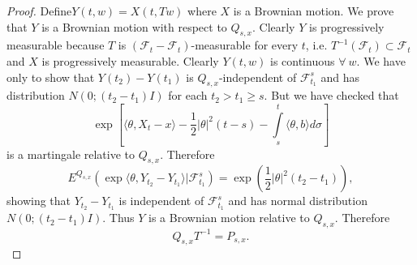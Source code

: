 \begin{proof}
Define\pageoriginale $Y(t,w)=X(t,Tw)$ where $X$ is a Brownian
motion. We prove that $Y$ is a Brownian motion with respect to
$Q_{s,x}$. Clearly $Y$ is progressively measurable because $T$ is
$(\mathscr{F}_{t}-\mathscr{F}_{t})$-measurable for every $t$, i.e.\@
$T^{-1}(\mathscr{F}_{t})\subset \mathscr{F}_{t}$ and $X$ is
progressively measurable. Clearly $Y(t,w)$ is continuous
$\forall\ w$. We have only to show that $Y(t_{2})-Y(t_{1})$ is
$Q_{s,x}$-independent of $\mathscr{F}^{s}_{t_{1}}$ and has
distribution $N(0;(t_{2}-t_{1})I)$ for each $t_{2}>t_{1}\geq s$. But
we have checked that
$$
\exp [\langle \theta,X_{t}-x\rangle
  -\frac{1}{2}|\theta|^{2}(t-s)-\int\limits^{t}_{s}\langle
  \theta,b\rangle d\sigma]
$$
is a martingale relative to $Q_{s,x}$. Therefore
$$
E^{Q_{s,x}}(\exp\langle \theta,Y_{t_{2}}-Y_{t_{1}}\rangle
|\mathscr{F}^{s}_{t_{1}})=\exp(\frac{1}{2}|\theta|^{2}(t_{2}-t_{1})), 
$$
showing that $Y_{t_{2}}-Y_{t_{1}}$ is independent of
$\mathscr{F}^{s}_{t_{1}}$ and has normal distribution
$N(0;(t_{2}-t_{1})I)$. Thus $Y$ is a Brownian motion relative to
$Q_{s,x}$. Therefore
$$
Q_{s,x}T^{-1}=P_{s,x}.
$$
\end{proof}

